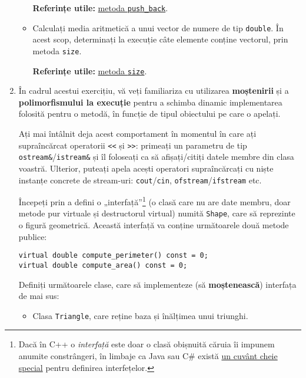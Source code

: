 \begin{enumerate}
\begin{itemize}
        \textbf{Referințe utile:} \href{https://cplusplus.com/reference/vector/vector/push_back/}{metoda \texttt{push\_back}}.

        \item Calculați media aritmetică a unui vector de numere de tip \texttt{double}. În acest scop, determinați la execuție câte elemente conține vectorul, prin metoda \texttt{size}.

        \textbf{Referințe utile:} \href{https://cplusplus.com/reference/vector/vector/size/}{metoda \texttt{size}}.
    \end{itemize}


    \item În cadrul acestui exercițiu, vă veți familiariza cu utilizarea \textbf{moștenirii} și a \textbf{polimorfismului la execuție} pentru a schimba dinamic implementarea folosită pentru o metodă, în funcție de tipul obiectului pe care o apelați.
    
    Ați mai întâlnit deja acest comportament în momentul în care ați supraîncărcat operatorii \texttt{<<} și \texttt{>>}: primeați un parametru de tip \texttt{ostream\&}/\texttt{istream\&} și îl foloseați ca să afișați/citiți datele membre din clasa voastră. Ulterior, puteați apela acești operatori supraîncărcați cu niște instanțe concrete de stream-uri: \texttt{cout}/\texttt{cin}, \texttt{ofstream}/\texttt{ifstream} etc.

    Începeți prin a defini o „interfață”\footnote{Dacă în C++ o \emph{interfață} este doar o clasă obișnuită căruia îi impunem anumite constrângeri, în limbaje ca Java sau C\# există \href{https://learn.microsoft.com/en-us/dotnet/csharp/language-reference/keywords/interface}{un cuvânt cheie special} pentru definirea interfețelor.} (o clasă care nu are date membru, doar metode pur virtuale și destructorul virtual) numită \texttt{Shape}, care să reprezinte o figură geometrică. Această interfață va conține următoarele două metode publice:
    \begin{lstlisting}
virtual double compute_perimeter() const = 0;
virtual double compute_area() const = 0;
\end{lstlisting}

    Definiți următoarele clase, care să implementeze (să \textbf{moștenească}) interfața de mai sus:
    \begin{itemize}
        \item Clasa \texttt{Triangle}, care reține baza și înălțimea unui triunghi.


\end{itemize}
\end{enumerate}

